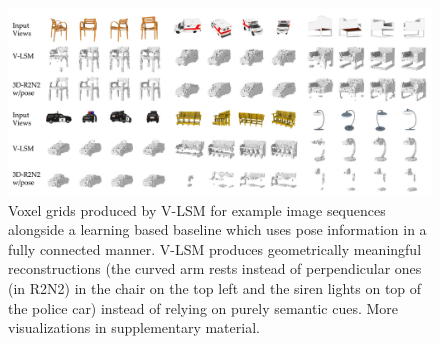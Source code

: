 \begin{figure}
\includegraphics[width=\linewidth]{figures/voxel_results.pdf}
\caption{Voxel grids produced by V-LSM for example image sequences alongside a learning based baseline which uses pose information in a fully connected manner. V-LSM produces geometrically meaningful reconstructions (\eg the curved arm rests instead of perpendicular ones (in R2N2) in the chair on the top left and the siren lights on top of the police car) instead of relying on purely semantic cues. More visualizations in supplementary material.}
\end{figure}